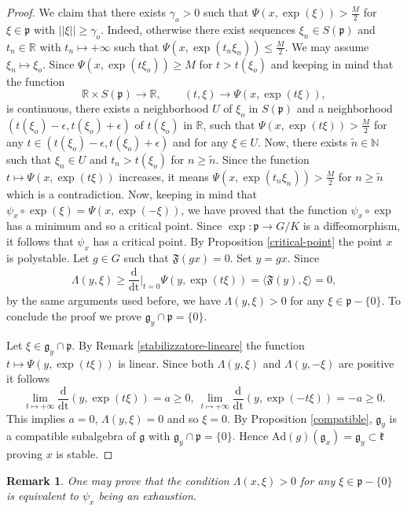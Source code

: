 \documentclass[leqno,11pt, a4]{amsart}
\newtheorem{remark}[equation]{Remark}
\theoremstyle{named}
\begin{document}
\begin{proof}
We claim that there exists $\gamma_o>0$ such that $\Psi(x,\exp(\xi))> \frac{M}{2}$ for $\xi \in {\mathfrak{p}}$ with $||\xi|| \geq \gamma_o$. Indeed, otherwise there exist sequences $\xi_n \in S({\mathfrak{p}})$ and $t_n \in {\mathbb{R}}$  with $t_n \mapsto +\infty$ such that $\Psi(x,\exp(t_n \xi_n )) \leq \frac{M}{2}$. We may assume $\xi_n \mapsto \xi_o$. Since
$\Psi(x,\exp( t\xi_o ))\geq M$ for $t>t(\xi_o)$ and keeping in mind that the function
\[
{\mathbb{R}} \times S({\mathfrak{p}}) {\longrightarrow} {\mathbb{R}}, \qquad (t,\xi)\to \Psi(x,\exp(t\xi)),
\]
is continuous, there exists a neighborhood $U$ of $\xi_o$ in $S({\mathfrak{p}})$ and a neighborhood $(t(\xi_o)-\epsilon,t(\xi_o)+\epsilon)$ of $t(\xi_o)$ in ${\mathbb{R}}$, such that $\Psi (x, \exp (t \xi))>\frac{M}{2}$ for any $t\in (t(\xi_o )-\epsilon,t( \xi_o )+\epsilon)$ and for any $\xi\in U$. Now,  there exists $\tilde n\in \mathbb N$ such that $\xi_n \in U$ and $t_n >t( \xi_o )$ for $n\geq \tilde n$. Since the function $t\mapsto \Psi(x,\exp(t\xi))$ increases, it means $\Psi(x,\exp (t_n \xi_n ))>\frac{M}{2}$ for $n\geq \tilde n$ which is a contradiction.
Now, keeping in mind that $\psi_x \circ \exp (\xi)=\Psi (x,\exp(-\xi))$, we have proved that the function $\psi_x \circ \exp$ has a minimum and so a critical point. Since $\exp:{\mathfrak{p}}{\longrightarrow} G/K$ is a diffeomorphism, it follows that $\psi_x$ has a critical point. By Proposition \ref{critical-point} the point $x$ is polystable. Let $g\in G$ such that ${\mathfrak{F}} (g x)=0$. Set $y=g x$. Since
\begin{gather*}
 {\Lambda}(y,\xi) \geq {{\dfrac {\mathrm {d}  }{\mathrm {dt}}} \vert _{t=0} } \Psi(y, \exp( t\xi ) )= {\langle} {\mathfrak{F}} (y), \xi {\rangle}=0,
\end{gather*}
by the same arguments used before, we have ${\Lambda} (y, \xi)>0$ for any $\xi\in {\mathfrak{p}}{-}\{0\}$. To conclude the proof we prove  ${\mathfrak{g}}_{y} \cap {\mathfrak{p}}=\{0\}$.

Let $\xi \in {\mathfrak{g}}_{y} \cap {\mathfrak{p}}$. By Remark \ref{stabilizzatore-lineare} the function
$
t\mapsto \Psi( y,\exp(t\xi))
$
is linear. Since both ${\Lambda}(y,\xi)$ and ${\Lambda}(y,-\xi)$ are positive it follows
\[
\lim_{t\mapsto +\infty} {\dfrac {\mathrm {d}  }{\mathrm {dt}}}(y,\exp(t\xi))=a\geq 0, \  \lim_{t\mapsto +\infty} {\dfrac {\mathrm {d}  }{\mathrm {dt}}}(y,\exp(-t\xi))=-a\geq 0.
\]
This implies $a=0$, $\Lambda(y,\xi)=0$ and so $\xi=0$. By Proposition \ref{compatible}, ${\mathfrak{g}}_{y}$ is a compatible subalgebra of ${\mathfrak{g}}$ with ${\mathfrak{g}}_{y}\cap {\mathfrak{p}}=\{0\}$. Hence $\mathrm{Ad}(g)({\mathfrak{g}}_x) ={\mathfrak{g}}_{y}\subset {\mathfrak{k}}$ proving $x$ is stable.
\end{proof}
\begin{remark}
One may prove that the condition ${\Lambda}(x,\xi)>0$ for any $\xi \in {\mathfrak{p}}{-}\{0\}$ is equivalent to $\psi_x$ being an exhaustion.
\end{remark}
\end{document}
